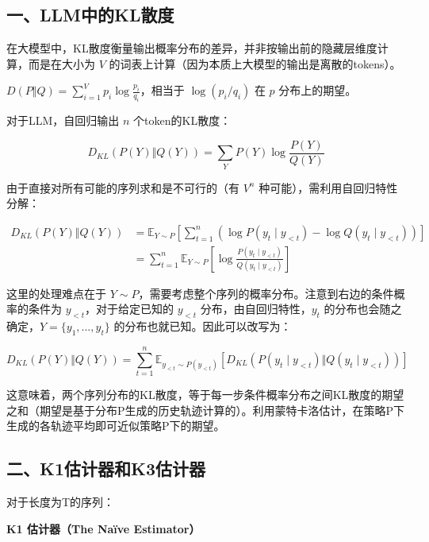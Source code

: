 \hypertarget{ux4e00llmux4e2dux7684klux6563ux5ea6}{%
\subsection{一、LLM中的KL散度}\label{ux4e00llmux4e2dux7684klux6563ux5ea6}}

在大模型中，KL散度衡量输出概率分布的差异，并非按输出前的隐藏层维度计算，而是在大小为 \(V\) 的词表上计算（因为本质上大模型的输出是离散的tokens）。

\(D(P \Vert Q)=\sum_{i=1}^{V}p_i\log\frac{p_i}{q_i}\)，相当于 \(\log(p_i/q_i)\) 在 \(p\) 分布上的期望。

对于LLM，自回归输出 \(n\) 个token的KL散度：

\[
D_{KL}(P(Y) \Vert Q(Y))=\sum_Y P(Y)\log\frac{P(Y)}{Q(Y)}
\]

由于直接对所有可能的序列求和是不可行的（有 \(V^n\) 种可能），需利用自回归特性分解：

\[
\begin{aligned}
D_{KL}(P(Y) \Vert Q(Y))
&= \mathbb{E}_{Y\sim P}\left[\sum_{t=1}^{n}\left(\log P(y_t\mid y_{<t})-\log Q(y_t\mid y_{<t})\right)\right] \\
&= \sum_{t=1}^{n}\mathbb{E}_{Y\sim P}\left[\log\frac{P(y_t\mid y_{<t})}{Q(y_t\mid y_{<t})}\right]
\end{aligned}
\]

这里的处理难点在于 \(Y\sim P\)，需要考虑整个序列的概率分布。注意到右边的条件概率的条件为 \(y_{<t}\)，对于给定已知的 \(y_{<t}\) 分布，由自回归特性，\(y_t\) 的分布也会随之确定，\(Y=\{y_1,\ldots,y_t\}\) 的分布也就已知。因此可以改写为：

\[
D_{KL}(P(Y) \Vert Q(Y))
=\sum_{t=1}^{n}\mathbb{E}_{y_{<t}\sim P(y_{<t})}\left[
D_{KL}\left(P(y_t\mid y_{<t}) \Vert Q(y_t\mid y_{<t})\right)
\right]
\]

这意味着，两个序列分布的KL散度，等于每一步条件概率分布之间KL散度的期望之和（期望是基于分布P生成的历史轨迹计算的）。利用蒙特卡洛估计，在策略P下生成的各轨迹平均即可近似策略P下的期望。

\hypertarget{ux4e8ck1ux4f30ux8ba1ux5668ux548ck3ux4f30ux8ba1ux5668}{%
\subsection{二、K1估计器和K3估计器}\label{ux4e8ck1ux4f30ux8ba1ux5668ux548ck3ux4f30ux8ba1ux5668}}

对于长度为T的序列：

\textbf{K1 估计器（The Naïve Estimator）}

